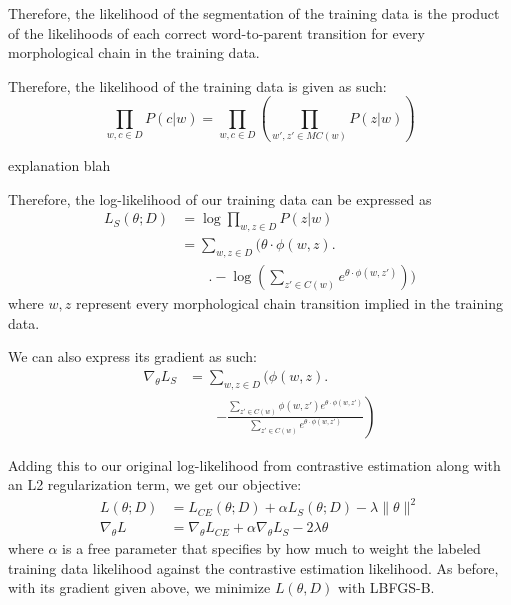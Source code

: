 \documentclass[11pt,twocolumn]{article}
\begin{document}
Therefore, the likelihood of the segmentation of the training data is the product of the likelihoods
of each correct word-to-parent transition for every morphological chain in the training data.

Therefore, the likelihood of the training data is given as such:
\begin{equation}
    \prod_{w, c \in D} P(c | w) = \prod_{w, c \in D}\left(\prod_{w', z' \in MC(w)} P(z | w)\right)
\end{equation}

explanation blah

Therefore, the log-likelihood of our training data can be expressed as
\begin{equation}
    \begin{split}
        L_S(\theta; D) &= \log{\prod_{w, z \in D} P(z|w)} \\
                       &= \sum_{w, z \in D} \Bigg(\theta \cdot \phi(w, z) \Bigg. \\
                       &\qquad\Bigg. - \log\left(\sum_{z' \in C(w)} e^{\theta \cdot \phi(w, z')} \right)\Bigg)
   \end{split}
\end{equation}
where $w, z$ represent every morphological chain transition implied in the training data.

We can also express its gradient as such:
\begin{equation}
    \begin{split}
        \nabla_\theta L_S &= \sum_{w, z \in D} \Bigg(\phi(w, z) \Bigg. \\
                          &\qquad\left. - \frac{\sum_{z' \in C(w)} \phi(w, z') e^{\theta \cdot \phi(w, z')} }{\sum_{z' \in C(w)} e^{\theta \cdot \phi(w, z')}}\right)
    \end{split}
\end{equation}

Adding this to our original log-likelihood from contrastive estimation
along with an L2 regularization term, we get our objective:
\begin{equation}
    \begin{split}
        L(\theta; D) &= L_{CE}(\theta; D) + \alpha L_S(\theta; D) - \lambda \| \theta \|^2 \\
        \nabla_\theta L &= \nabla_\theta L_{CE} + \alpha \nabla_\theta L_S - 2\lambda \theta
    \end{split}
\end{equation}
where $\alpha$ is a free parameter that specifies by how much to weight the labeled training data likelihood
against the contrastive estimation likelihood.
As before, with its gradient given above, we minimize $L(\theta, D)$ with LBFGS-B.
\end{document}
